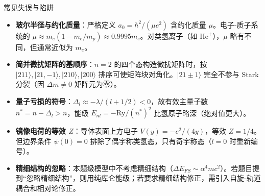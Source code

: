 \begin{errorbox}{常见失误与陷阱}
\begin{itemize}
    \item \textbf{玻尔半径与约化质量}：严格定义 $a_0=\hbar^2/(\mu e^2)$ 含约化质量 $\mu$。电子-质子系统的 $\mu\approx m_e(1-m_e/m_p)\approx0.9995m_e$。对类氢离子（如 $\text{He}^+$），$\mu$ 略有不同，但通常近似为 $m_e$。
    \item \textbf{简并微扰矩阵的基顺序}：$n=2$ 的四个态构造微扰矩阵时，按 $|211\rangle,|21,-1\rangle,|210\rangle,|200\rangle$ 排序可使矩阵块对角化。$|21\pm1\rangle$ 完全不参与 Stark 分裂（因 $\Delta m\neq0$ 矩阵元为零）。
    \item \textbf{量子亏损的符号}：$\Delta_l\approx-\lambda/(l+1/2)<0$，故有效主量子数 $n^*=n-\Delta_l>n$，能级 $E_{nl}=-\text{Ry}/(n^*)^2$ 比氢原子略深（绝对值更大）。
    \item \textbf{镜像电荷的等效 $Z$}：导体表面上方电子 $V(y)=-e^2/(4y)$，等效 $Z=1/4$。但边界条件 $\psi(0)=0$ 排除了偶宇称类氢态，只有奇宇称态（$l=0$ 时重新编号）。
    \item \textbf{精细结构的忽略}：本题级模型中不考虑精细结构（$\Delta E_{FS}\sim\alpha^4mc^2$）。若题目提到``忽略精细结构''，则用纯库仑能级；若要求精细结构修正，需引入自旋-轨道耦合和相对论修正。
\end{itemize}
\end{errorbox}

